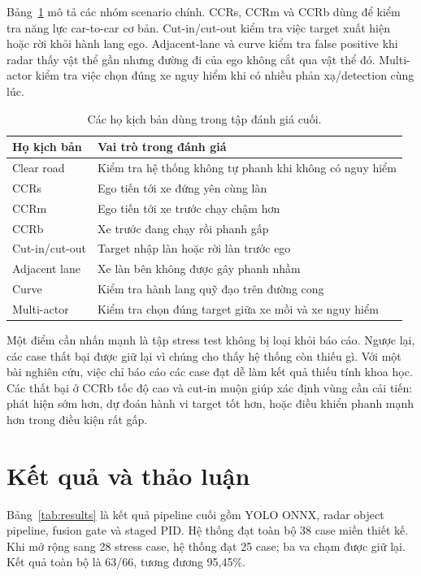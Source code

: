 \documentclass[conference]{IEEEtran}
\begin{document}
Bảng~\ref{tab:scenariofamilies} mô tả các nhóm scenario chính. CCRs, CCRm và CCRb dùng để kiểm tra năng lực car-to-car cơ bản. Cut-in/cut-out kiểm tra việc target xuất hiện hoặc rời khỏi hành lang ego. Adjacent-lane và curve kiểm tra false positive khi radar thấy vật thể gần nhưng đường đi của ego không cắt qua vật thể đó. Multi-actor kiểm tra việc chọn đúng xe nguy hiểm khi có nhiều phản xạ/detection cùng lúc.

\begin{table}[t]
\caption{Các họ kịch bản dùng trong tập đánh giá cuối.}
\label{tab:scenariofamilies}
\centering
\footnotesize
\begin{tabular}{p{}p{}}
\toprule
Họ kịch bản & Vai trò trong đánh giá \\
\midrule
Clear road & Kiểm tra hệ thống không tự phanh khi không có nguy hiểm \\
CCRs & Ego tiến tới xe đứng yên cùng làn \\
CCRm & Ego tiến tới xe trước chạy chậm hơn \\
CCRb & Xe trước đang chạy rồi phanh gấp \\
Cut-in/cut-out & Target nhập làn hoặc rời làn trước ego \\
Adjacent lane & Xe làn bên không được gây phanh nhầm \\
Curve & Kiểm tra hành lang quỹ đạo trên đường cong \\
Multi-actor & Kiểm tra chọn đúng target giữa xe mồi và xe nguy hiểm \\
\bottomrule
\end{tabular}
\end{table}

Một điểm cần nhấn mạnh là tập stress test không bị loại khỏi báo cáo. Ngược lại, các case thất bại được giữ lại vì chúng cho thấy hệ thống còn thiếu gì. Với một bài nghiên cứu, việc chỉ báo cáo các case đạt dễ làm kết quả thiếu tính khoa học. Các thất bại ở CCRb tốc độ cao và cut-in muộn giúp xác định vùng cần cải tiến: phát hiện sớm hơn, dự đoán hành vi target tốt hơn, hoặc điều khiển phanh mạnh hơn trong điều kiện rất gấp.

\section{Kết quả và thảo luận}
Bảng~\ref{tab:results} là kết quả pipeline cuối gồm YOLO ONNX, radar object pipeline, fusion gate và staged PID. Hệ thống đạt toàn bộ 38 case miền thiết kế. Khi mở rộng sang 28 stress case, hệ thống đạt 25 case; ba va chạm được giữ lại. Kết quả toàn bộ là 63/66, tương đương 95,45\%.
\end{document}
